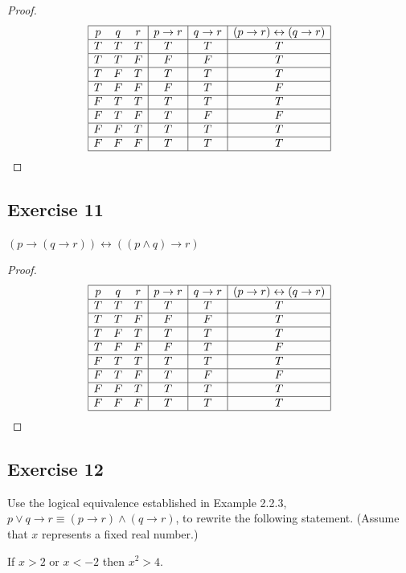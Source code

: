 \documentclass[14pt]{extarticle}
\newcommand{\bic}{\leftrightarrow}
\begin{document}
\begin{proof} 
$$ 
\begin{array}{|ccc|c|c|c|} 
\hline 
p & q & r & p \to r & q \to r & (p \to r) \bic (q \to r) \\ 
\hline 
T & T & T & T & T & T \\ 
\hline 
T & T & F & F & F & T \\ 
\hline 
T & F & T & T & T & T \\ 
\hline 
T & F & F & F & T & F \\
\hline 
F & T & T & T & T & T \\ 
\hline 
F & T & F & T & F & F \\ 
\hline  
F & F & T & T & T & T \\ 
\hline 
F & F & F & T & T & T \\ 
\hline 
\end{array} 
$$ 
\end{proof}

\subsection{Exercise 11} 
$(p \to (q \to r)) \bic ((p \wedge q) \to r)$

\begin{proof} 
$$ 
\begin{array}{|ccc|c|c|c|} 
\hline 
p & q & r & p \to r & q \to r & (p \to r) \bic (q \to r) \\
\hline 
T & T & T & T & T & T \\ 
\hline 
T & T & F & F & F & T \\ 
\hline 
T & F & T & T & T & T \\ 
\hline 
T & F & F & F & T & F \\
\hline 
F & T & T & T & T & T \\ 
\hline 
F & T & F & T & F & F \\ 
\hline 
F & F & T & T & T & T \\ 
\hline 
F & F & F & T & T & T \\ 
\hline 
\end{array} 
$$ 
\end{proof}

\subsection{Exercise 12} 
Use the logical equivalence established in Example 2.2.3, $p \vee q \to r \equiv (p \to r) \wedge (q \to r)$, to rewrite the
following statement. (Assume that $x$ represents a fixed real number.)
\begin{center} 
If $x > 2$ or $x < -2$ then $x^2 > 4$. 
\end{center}
\end{document}
